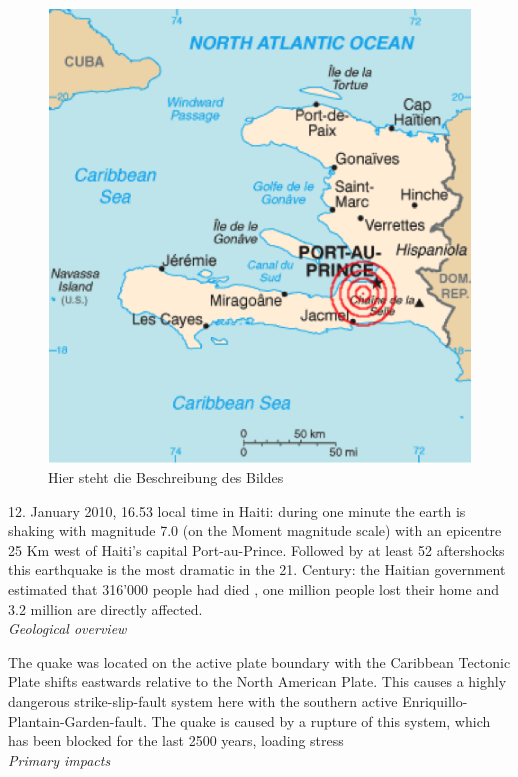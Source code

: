 \documentclass[11pt]{article}
\begin{document}
\begin{figure}
\includegraphics[scale=0.8]{Bilder/KarteHaiti.png}
\caption{Hier steht die Beschreibung des Bildes}%
\end{figure}
12. January 2010, 16.53 local time in Haiti: during one minute the earth is shaking with magnitude 7.0  (on the Moment magnitude scale) with an epicentre 25 Km west of Haiti’s capital Port-au-Prince. Followed by at least 52 aftershocks  this earthquake is the most dramatic in the 21. Century: the Haitian government estimated that 316’000 people had died , one million people lost their home  and 3.2 million are directly affected.
\\[1em]
\noindent \textit{Geological overview}

The quake was located on the active plate boundary with the Caribbean Tectonic Plate shifts eastwards relative to the North American Plate. This causes a highly dangerous strike-slip-fault system here with the southern active Enriquillo-Plantain-Garden-fault. The quake is caused by a rupture of this system, which has been blocked for the last 2500 years, loading stress
\\[1em]
\noindent\textit{Primary impacts}
\end{document}

